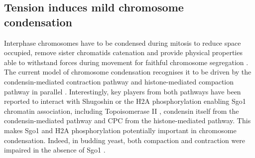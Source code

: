 \subsection{Tension induces mild chromosome condensation}

Interphase chromosomes have to be condensed during mitosis to reduce space occupied, remove sister chromatids catenation and provide physical properties able to withstand forces during movement for faithful chromosome segregation \citep{Antonin2016ChromosomeMitosis, Piskadlo2016NovelCondensation, Beseda2020MitoticVariability, Takahashi2019FoldingChromosomes}. The current model of chromosome condensation recognises it to be driven by the condensin-mediated contraction pathway and histone-mediated compaction pathway in parallel \citep{Wilkins2014AMitosis, Kruitwagen2015a}. Interestingly, key players from both pathways have been reported to interact with Shugoshin or the H2A phosphorylation enabling Sgo1 chromatin association, including Topoisomerase II \citep{Zhang2020FunctioningMitosis}, condensin itself \citep{Verzijlbergen2014, Yahya2020} from the condensin-mediated pathway and CPC \citep{Abad2022MechanisticCPC} from the histone-mediated pathway. This makes Sgo1 and H2A phosphorylation potentially important in chromosome condensation. Indeed, in budding yeast, both compaction and contraction were impaired in the absence of Sgo1 \citep{Kruitwagen2018}. 

